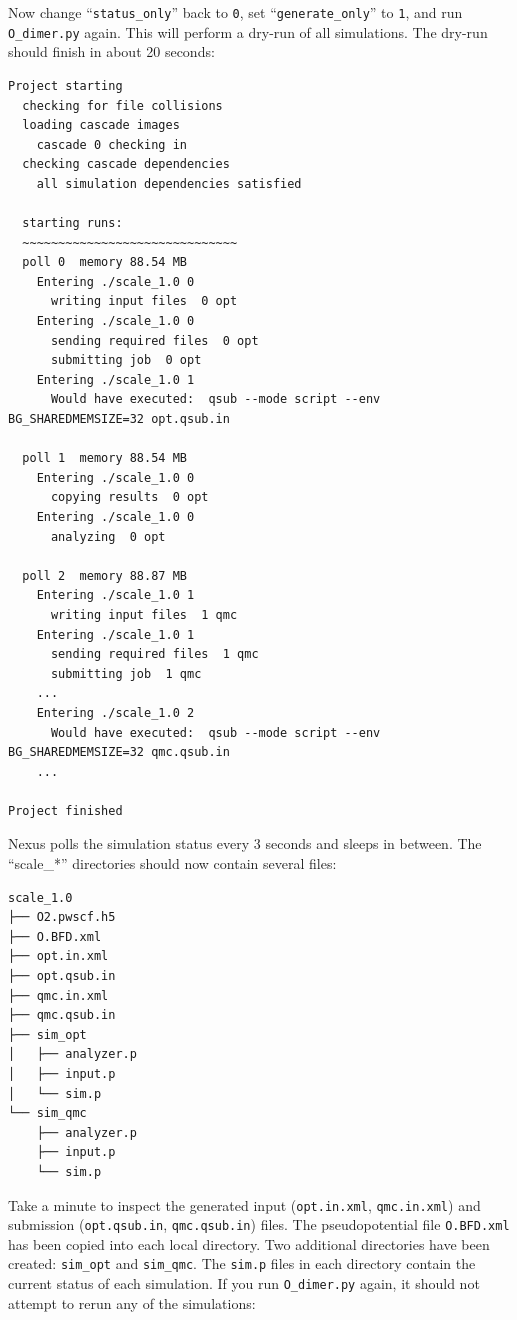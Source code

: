Now change ``\texttt{status\_only}'' back to \texttt{0}, set ``\texttt{generate\_only}'' to \texttt{1}, and run \texttt{O\_dimer.py} again.  This will perform a dry-run of all simulations.  The dry-run should finish in about 20 seconds:
\begin{shaded}
\begin{verbatim}
Project starting 
  checking for file collisions 
  loading cascade images 
    cascade 0 checking in 
  checking cascade dependencies 
    all simulation dependencies satisfied 
  
  starting runs:
  ~~~~~~~~~~~~~~~~~~~~~~~~~~~~~~ 
  poll 0  memory 88.54 MB 
    Entering ./scale_1.0 0 
      writing input files  0 opt 
    Entering ./scale_1.0 0 
      sending required files  0 opt 
      submitting job  0 opt 
    Entering ./scale_1.0 1 
      Would have executed:  qsub --mode script --env BG_SHAREDMEMSIZE=32 opt.qsub.in 

  poll 1  memory 88.54 MB 
    Entering ./scale_1.0 0 
      copying results  0 opt 
    Entering ./scale_1.0 0 
      analyzing  0 opt 

  poll 2  memory 88.87 MB 
    Entering ./scale_1.0 1 
      writing input files  1 qmc 
    Entering ./scale_1.0 1 
      sending required files  1 qmc 
      submitting job  1 qmc 
    ...
    Entering ./scale_1.0 2 
      Would have executed:  qsub --mode script --env BG_SHAREDMEMSIZE=32 qmc.qsub.in 
    ...

Project finished
\end{verbatim}
\end{shaded}
\noindent
Nexus polls the simulation status every 3 seconds and sleeps in between.  The ``scale\_*'' directories should now contain several files:
\begin{shaded}
\begin{verbatim}
scale_1.0
├── O2.pwscf.h5
├── O.BFD.xml
├── opt.in.xml
├── opt.qsub.in
├── qmc.in.xml
├── qmc.qsub.in
├── sim_opt
│   ├── analyzer.p
│   ├── input.p
│   └── sim.p
└── sim_qmc
    ├── analyzer.p
    ├── input.p
    └── sim.p
\end{verbatim}
\end{shaded}
\noindent
Take a minute to inspect the generated input (\texttt{opt.in.xml}, \texttt{qmc.in.xml}) and submission (\texttt{opt.qsub.in}, \texttt{qmc.qsub.in}) files.  The pseudopotential file \texttt{O.BFD.xml} has been copied into each local directory. Two additional directories have been created: \texttt{sim\_opt} and \texttt{sim\_qmc}.  The \texttt{sim.p} files in each directory contain the current status of each simulation.  If you run \texttt{O\_dimer.py} again, it should not attempt to rerun any of the simulations:   
